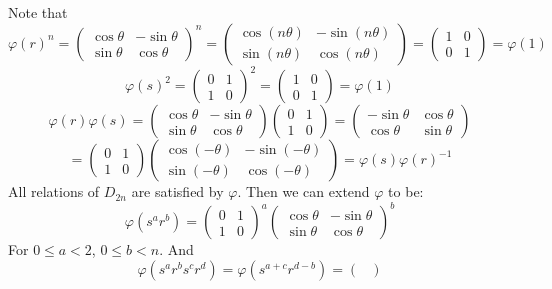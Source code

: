 \documentclass[12pt]{article}
\begin{document}
\begin{itemize}
\begin{itemize}
Note that 
$$\varphi(r)^n = \begin{pmatrix}
\cos\theta & -\sin\theta \\
\sin\theta & \cos\theta
\end{pmatrix}^n = \begin{pmatrix}
\cos(n\theta) & -\sin(n\theta) \\
\sin(n\theta) & \cos(n\theta)
\end{pmatrix} = \begin{pmatrix}
1 & 0 \\
0 & 1
\end{pmatrix} = \varphi(1)$$
$$\varphi(s)^2 = \begin{pmatrix}
0 & 1 \\
1 & 0
\end{pmatrix}^2 = \begin{pmatrix}
1 & 0 \\
0 & 1
\end{pmatrix} = \varphi(1)$$
$$\varphi(r)\varphi(s) = \begin{pmatrix}
\cos\theta & -\sin\theta \\
\sin\theta & \cos\theta
\end{pmatrix}\begin{pmatrix}
0 & 1 \\
1 & 0
\end{pmatrix} = \begin{pmatrix}
-\sin\theta & \cos\theta \\
\cos\theta & \sin\theta
\end{pmatrix}$$
$$= \begin{pmatrix}
0 & 1 \\
1 & 0
\end{pmatrix}\begin{pmatrix}
\cos(-\theta) & -\sin(-\theta) \\
\sin(-\theta) & \cos(-\theta)
\end{pmatrix} = \varphi(s)\varphi(r)^{-1}$$
All relations of $D_{2n}$ are satisfied by $\varphi$. Then we can extend $\varphi$ to be:
$$\varphi(s^ar^b) = \begin{pmatrix}
0 & 1 \\
1 & 0
\end{pmatrix}^a\begin{pmatrix}
\cos\theta & -\sin\theta \\
\sin\theta & \cos\theta
\end{pmatrix}^b$$
For $0 \leq a < 2$, $0 \leq b < n$. And
$$\varphi(s^ar^bs^cr^d) = \varphi(s^{a+c}r^{d-b}) = \begin{pmatrix}

\end{pmatrix}$$
\end{itemize}
\end{itemize}
\end{document}
